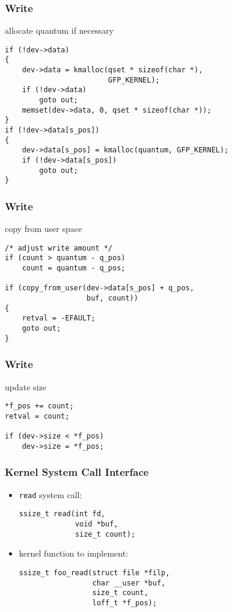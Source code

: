 \documentclass[dvipsnames]{beamer}
\begin{document}
\begin{frame}[fragile]
  \frametitle{Write}

  \begin{exampleblock}{allocate quantum if necessary}
    \begin{lstlisting}
if (!dev->data)
{
    dev->data = kmalloc(qset * sizeof(char *),
                        GFP_KERNEL);
    if (!dev->data)
        goto out;
    memset(dev->data, 0, qset * sizeof(char *));
}
if (!dev->data[s_pos])
{
    dev->data[s_pos] = kmalloc(quantum, GFP_KERNEL);
    if (!dev->data[s_pos])
        goto out;
}
    \end{lstlisting}
  \end{exampleblock}
\end{frame}

\begin{frame}[fragile]
  \frametitle{Write}

  \begin{exampleblock}{copy from user space}
    \begin{lstlisting}
/* adjust write amount */
if (count > quantum - q_pos)
    count = quantum - q_pos;

if (copy_from_user(dev->data[s_pos] + q_pos,
                   buf, count))
{
    retval = -EFAULT;
    goto out;
}
    \end{lstlisting}
  \end{exampleblock}
\end{frame}

\begin{frame}[fragile]
  \frametitle{Write}

  \begin{exampleblock}{update size}
    \begin{lstlisting}
*f_pos += count;
retval = count;

if (dev->size < *f_pos)
    dev->size = *f_pos;
    \end{lstlisting}
  \end{exampleblock}
\end{frame}

\begin{frame}[fragile]
  \frametitle{Kernel System Call Interface}

  \begin{itemize}
    \item \lstinline|read| system call:
    \begin{lstlisting}
ssize_t read(int fd,
             void *buf,
             size_t count);
    \end{lstlisting}

    \medskip
    \item kernel function to implement:
    \begin{lstlisting}
ssize_t foo_read(struct file *filp,
                 char __user *buf,
                 size_t count,
                 loff_t *f_pos);
    \end{lstlisting}
  \end{itemize}
\end{frame}
\end{document}
